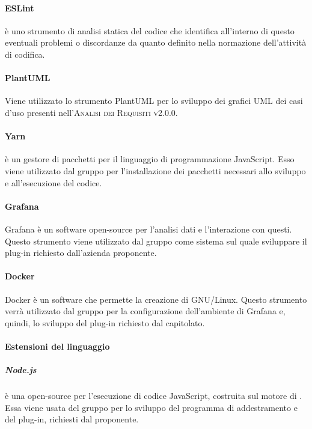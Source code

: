 \documentclass[../norme-di-progetto.tex]{subfiles}
\begin{document}
\paragraph{ESLint}
 è uno strumento di analisi statica del codice che identifica all'interno di questo eventuali problemi o discordanze da quanto definito nella normazione dell'attività di codifica.

\paragraph{PlantUML}
Viene utilizzato lo strumento PlantUML per lo sviluppo dei grafici UML dei casi d'uso presenti nell'\textsc{Analisi dei Requisiti v2.0.0}.

\paragraph{Yarn}
 è un gestore di pacchetti per il linguaggio di programmazione JavaScript. Esso viene utilizzato dal gruppo per l'installazione dei pacchetti necessari allo sviluppo e all'esecuzione del codice.

\paragraph{Grafana}
Grafana è un software open-source per l'analisi dati e l'interazione con questi. Questo strumento viene utilizzato dal gruppo come sistema sul quale sviluppare il plug-in richiesto dall'azienda proponente.

\paragraph{Docker}
Docker è un software che permette la creazione di  GNU/Linux. Questo strumento verrà utilizzato dal gruppo per la configurazione dell'ambiente di Grafana e, quindi, lo sviluppo del plug-in richiesto dal capitolato.

\paragraph{Estensioni del linguaggio}
\subparagraph{Node.js}
 è una  open-source per l'esecuzione di codice JavaScript, costruita sul motore  di . Essa viene usata del gruppo per lo sviluppo del programma di addestramento e del plug-in, richiesti dal proponente.
\end{document}
